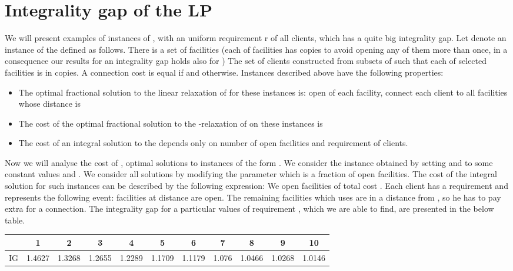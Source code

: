 \documentclass{llncs}
\begin{document}
\section{Integrality gap of the LP}
\label{int_gap_section}
We will present examples of instances of , with an uniform requirement r of all clients, which has a quite big integrality gap. Let  denote an instance of the  defined as follows. There is a set of facilities  (each of  facilities has  copies to avoid opening any of them more than once, in a consequence our results for an integrality gap holds also for ) The set of clients  constructed from subsets of  such that each of  selected facilities is in  copies. A connection cost  is equal  if  and  otherwise. Instances described above have the following properties:

\begin{itemize}
\renewcommand{\labelitemi}{}
 \item The optimal fractional solution to the linear relaxation of  for these instances is: open  of each facility, connect each client  to all facilities whose distance is 
 \item The cost of the optimal fractional solution to the -relaxation of  on these instances is  
 \item The cost of an integral solution to the  depends only on number of open facilities and requirement of clients.
\end{itemize}

Now we will analyse the cost of , optimal solutions to instances of the form . We consider the instance obtained by setting  and  to some constant values and . We consider all solutions by modifying the parameter  which is a fraction of open facilities. The cost of the integral solution for such instances can be described by the following expression:  We open  facilities of total cost . Each client has a requirement  and  represents the following event:  facilities at distance  are open. The remaining   facilities which  uses are in a distance  from , so he has to pay extra for a connection. The integrality gap for a particular 
values of requirement , which we are able to find, are presented in the below table.

\begin{center}
  \begin{tabular}{ c | c | c | c | c | c | c | c | c | c | c }
     & 1 & 2 & 3 & 4 & 5 & 6 & 7 & 8 & 9 & 10\\ \hline
    IG & 1.4627 & 1.3268 & 1.2655 & 1.2289 & 1.1709 & 1.1179 & 1.076 & 1.0466 & 1.0268 & 1.0146 \\
  \end{tabular}
\end{center}
\end{document}
